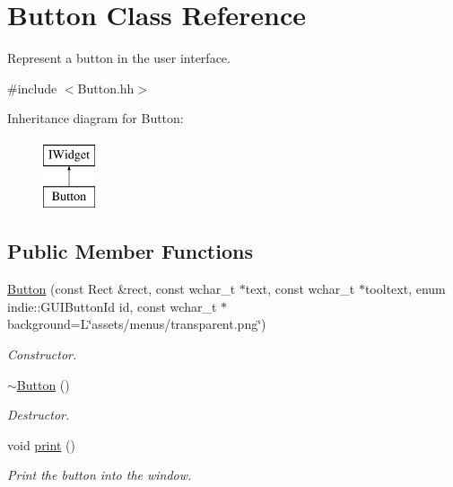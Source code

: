 \hypertarget{classButton}{}\section{Button Class Reference}
\label{classButton}


Represent a button in the user interface.  




{\ttfamily \#include $<$Button.\+hh$>$}

Inheritance diagram for Button\+:\begin{figure}[H]
\begin{center}
\leavevmode
\includegraphics[height=2.000000cm]{classButton}
\end{center}
\end{figure}
\subsection*{Public Member Functions}
\begin{DoxyCompactItemize}
\item 
\hyperlink{classButton_a5729094ff8ec4ce3e64e6691c297983c}{Button} (const Rect \&rect, const wchar\+\_\+t $\ast$text, const wchar\+\_\+t $\ast$tooltext, enum indie\+::\+G\+U\+I\+Button\+Id id, const wchar\+\_\+t $\ast$background=L\char`\"{}assets/menus/transparent.\+png\char`\"{})
\begin{DoxyCompactList}\small\item\em Constructor. \end{DoxyCompactList}\item 
\mbox{\label{classButton_a2a001eb9c3cc8ae54768a850dd345002}} 
\hyperlink{classButton_a2a001eb9c3cc8ae54768a850dd345002}{$\sim$\+Button} ()
\begin{DoxyCompactList}\small\item\em Destructor. \end{DoxyCompactList}\item 
\mbox{\label{classButton_a614921b7355d17e6074b44fa34862c6e}} 
void \hyperlink{classButton_a614921b7355d17e6074b44fa34862c6e}{print} ()
\begin{DoxyCompactList}\small\item\em Print the button into the window. \end{DoxyCompactList}\end{DoxyCompactItemize}


